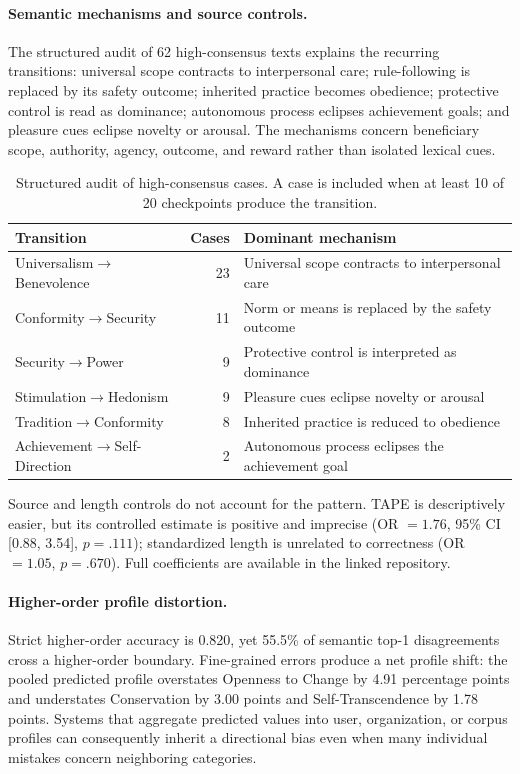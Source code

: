 \documentclass[runningheads,a4paper]{llncs}
\begin{document}
\paragraph{Semantic mechanisms and source controls.}
The structured audit of 62 high-consensus texts explains the recurring transitions: universal scope contracts to interpersonal care; rule-following is replaced by its safety outcome; inherited practice becomes obedience; protective control is read as dominance; autonomous process eclipses achievement goals; and pleasure cues eclipse novelty or arousal. The mechanisms concern beneficiary scope, authority, agency, outcome, and reward rather than isolated lexical cues.

\begin{table}[H]
\caption{Structured audit of high-consensus cases. A case is included when at least 10 of 20 checkpoints produce the transition.}
\label{tab:caseaudit}
\centering
\scriptsize
\setlength{\tabcolsep}{3.0pt}
\renewcommand{\arraystretch}{0.95}
\begin{tabular}{@{}lrl@{}}
\toprule
Transition & Cases & Dominant mechanism \\
\midrule
Universalism$\rightarrow$Benevolence & 23 & Universal scope contracts to interpersonal care \\
Conformity$\rightarrow$Security & 11 & Norm or means is replaced by the safety outcome \\
Security$\rightarrow$Power & 9 & Protective control is interpreted as dominance \\
Stimulation$\rightarrow$Hedonism & 9 & Pleasure cues eclipse novelty or arousal \\
Tradition$\rightarrow$Conformity & 8 & Inherited practice is reduced to obedience \\
Achievement$\rightarrow$Self-Direction & 2 & Autonomous process eclipses the achievement goal \\
\bottomrule
\end{tabular}
\end{table}

Source and length controls do not account for the pattern. TAPE is descriptively easier, but its controlled estimate is positive and imprecise (OR $=1.76$, 95\% CI [0.88, 3.54], $p=.111$); standardized length is unrelated to correctness (OR $=1.05$, $p=.670$). Full coefficients are available in the linked repository.

\paragraph{Higher-order profile distortion.}
Strict higher-order accuracy is 0.820, yet 55.5\% of semantic top-1 disagreements cross a higher-order boundary. Fine-grained errors produce a net profile shift: the pooled predicted profile overstates Openness to Change by 4.91 percentage points and understates Conservation by 3.00 points and Self-Transcendence by 1.78 points. Systems that aggregate predicted values into user, organization, or corpus profiles can consequently inherit a directional bias even when many individual mistakes concern neighboring categories.
\end{document}

